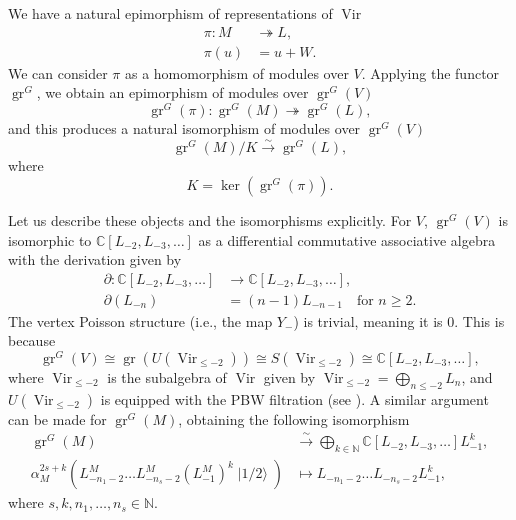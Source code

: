 \documentclass[a4paper, 12pt, reqno]{amsart}
\theoremstyle{remark}
\DeclareMathOperator{\Vir}{Vir}
\DeclareMathOperator{\gr}{gr}
\DeclareMathOperator{\vachalf}{|1/2\rangle}
\begin{document}
We have a natural epimorphism of representations of $\Vir$
\begin{align*}
  \pi: M &\twoheadrightarrow L, \\
  \pi(u) &= u + W.
\end{align*}
We can consider $\pi$ as a homomorphism of modules over $V$.
Applying the functor $\gr^G$, we obtain an epimorphism of modules over $\gr^G(V)$
\begin{equation*}
  \gr^G(\pi): \gr^G(M) \twoheadrightarrow \gr^G(L),
\end{equation*}
and this produces a natural isomorphism of modules over $\gr^G(V)$
\begin{equation*}
  \gr^G(M)/K \xrightarrow{\sim} \gr^G(L),
\end{equation*}
where
\begin{equation}
  \label{eq:4}
  K = \ker(\gr^G(\pi)).
\end{equation}

Let us describe these objects and the isomorphisms explicitly.
For $V$, $\gr^G(V)$ is isomorphic to $\mathbb{C}[L_{-2}, L_{-3}, \dots]$ as a differential commutative associative algebra with the derivation given by
\begin{align*}
  \partial: \mathbb{C}[L_{-2}, L_{-3}, \dots] &\to \mathbb{C}[L_{-2}, L_{-3}, \dots], \\
  \partial(L_{-n}) &= (n - 1)L_{-n - 1} \quad \text{for $n \ge 2$}.
\end{align*}
The vertex Poisson structure (i.e., the map $Y_-$) is trivial, meaning it is $0$.
This is because
\begin{equation*}
  \gr^G(V) \cong \gr(U(\Vir_{\le -2})) \cong S(\Vir_{\le -2}) \cong \mathbb{C}[L_{-2}, L_{-3}, \dots],
\end{equation*}
where $\Vir_{\le -2}$ is the subalgebra of $\Vir$ given by $\Vir_{\le -2} = \bigoplus_{n \le -2}L_n$, and $U(\Vir_{\le -2})$ is equipped with the PBW filtration (see \cite[\S2]{dixmier_enveloping_1996}).
A similar argument can be made for $\gr^G(M)$, obtaining the following isomorphism
\begin{align*}
  \gr^G(M) &\xrightarrow{\sim} \bigoplus_{k \in \mathbb{N}}\mathbb{C}[L_{-2}, L_{-3}, \dots]L_{-1}^k, \\
  \alpha_M^{2s + k}(L_{-n_1 - 2}^M\dots L_{-n_s - 2}^M(L_{-1}^M)^k\vachalf) &\mapsto L_{-n_1 - 2}\dots L_{-n_s - 2}L_{-1}^k,
\end{align*}
where $s, k, n_1, \dots, n_s \in \mathbb{N}$.
\end{document}
